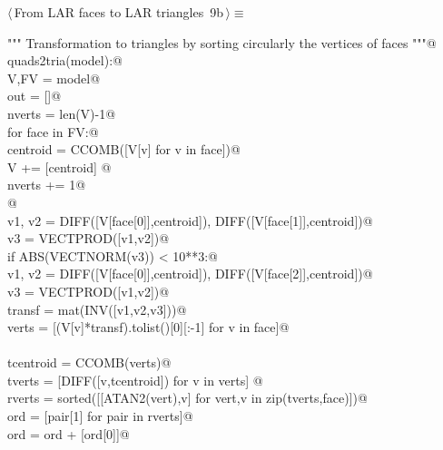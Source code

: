 \documentclass[11pt,oneside]{article}	%
\begin{document}
\begin{flushleft} \small \label{scrap10}
\protect{}$\langle\,$From LAR faces to LAR triangles\nobreak\ {\footnotesize 9b}$\,\rangle\equiv$
\vspace{-1ex}
\begin{list}{}{} \item
\mbox{}\verb@""" Transformation to triangles by sorting circularly the vertices of faces """@\\
\mbox{}\verb@def quads2tria(model):@\\
\mbox{}\verb@   V,FV = model@\\
\mbox{}\verb@   out = []@\\
\mbox{}\verb@   nverts = len(V)-1@\\
\mbox{}\verb@   for face in FV:@\\
\mbox{}\verb@      centroid = CCOMB([V[v] for v in face])@\\
\mbox{}\verb@      V += [centroid] @\\
\mbox{}\verb@      nverts += 1@\\
\mbox{}\verb@      @\\
\mbox{}\verb@      v1, v2 = DIFF([V[face[0]],centroid]), DIFF([V[face[1]],centroid])@\\
\mbox{}\verb@      v3 = VECTPROD([v1,v2])@\\
\mbox{}\verb@      if ABS(VECTNORM(v3)) < 10**3:@\\
\mbox{}\verb@         v1, v2 = DIFF([V[face[0]],centroid]), DIFF([V[face[2]],centroid])@\\
\mbox{}\verb@         v3 = VECTPROD([v1,v2])@\\
\mbox{}\verb@      transf = mat(INV([v1,v2,v3]))@\\
\mbox{}\verb@      verts = [(V[v]*transf).tolist()[0][:-1]  for v in face]@\\
\mbox{}\verb@@\\
\mbox{}\verb@      tcentroid = CCOMB(verts)@\\
\mbox{}\verb@      tverts = [DIFF([v,tcentroid]) for v in verts]   @\\
\mbox{}\verb@      rverts = sorted([[ATAN2(vert),v] for vert,v in zip(tverts,face)])@\\
\mbox{}\verb@      ord = [pair[1] for pair in rverts]@\\
\mbox{}\verb@      ord = ord + [ord[0]]@\\

\end{list}
\end{flushleft}
\end{document}
